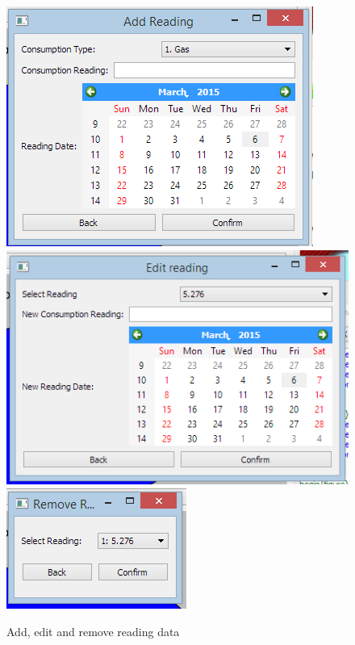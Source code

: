 \begin{figure}[H]
	\includegraphics{./maintenance/images/UI_Add_Reading.png}
	\includegraphics{./maintenance/images/UI_Edit_Reading.png}
	\includegraphics{./maintenance/images/UI_Remove_Reading.png}
	\caption{Add, edit and remove reading data}
\end{figure}

